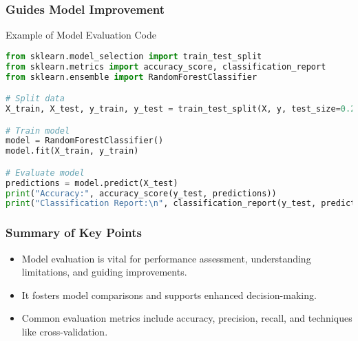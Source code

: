 \documentclass{beamer}
\begin{document}
\begin{frame}[fragile]
    \frametitle{Guides Model Improvement}
    \begin{block}{Example of Model Evaluation Code}
    \begin{lstlisting}[language=Python]
from sklearn.model_selection import train_test_split
from sklearn.metrics import accuracy_score, classification_report
from sklearn.ensemble import RandomForestClassifier

# Split data
X_train, X_test, y_train, y_test = train_test_split(X, y, test_size=0.2)

# Train model
model = RandomForestClassifier()
model.fit(X_train, y_train)

# Evaluate model
predictions = model.predict(X_test)
print("Accuracy:", accuracy_score(y_test, predictions))
print("Classification Report:\n", classification_report(y_test, predictions))
    \end{lstlisting}
    \end{block}
\end{frame}

\begin{frame}[fragile]
    \frametitle{Summary of Key Points}
    \begin{itemize}
        \item Model evaluation is vital for performance assessment, understanding limitations, and guiding improvements.
        \item It fosters model comparisons and supports enhanced decision-making.
        \item Common evaluation metrics include accuracy, precision, recall, and techniques like cross-validation.
    \end{itemize}
\end{frame}
\end{document}
